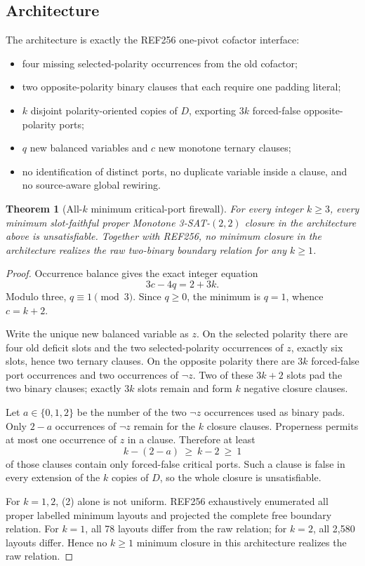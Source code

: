 \documentclass[11pt]{article}
\newtheorem{theorem}{Theorem}
\begin{document}
\subsection{Architecture}
The architecture is exactly the REF256 one-pivot cofactor interface:
\begin{itemize}
\item four missing selected-polarity occurrences from the old cofactor;
\item two opposite-polarity binary clauses that each require one padding literal;
\item $k$ disjoint polarity-oriented copies of $D$, exporting $3k$ forced-false opposite-polarity ports;
\item $q$ new balanced variables and $c$ new monotone ternary clauses;
\item no identification of distinct ports, no duplicate variable inside a clause, and no source-aware global rewiring.
\end{itemize}

\begin{theorem}[All-$k$ minimum critical-port firewall]
For every integer $k\geq3$, every minimum slot-faithful proper Monotone 3-SAT-$(2,2)$ closure in the architecture above is unsatisfiable.  Together with REF256, no minimum closure in the architecture realizes the raw two-binary boundary relation for any $k\geq1$.
\end{theorem}

\begin{proof}
Occurrence balance gives the exact integer equation
\[
        3c-4q=2+3k.                                      \tag{1}
\]
Modulo three, $q\equiv1\pmod3$.  Since $q\geq0$, the minimum is $q=1$, whence $c=k+2$.

Write the unique new balanced variable as $z$.  On the selected polarity there are four old deficit slots and the two selected-polarity occurrences of $z$, exactly six slots, hence two ternary clauses.  On the opposite polarity there are $3k$ forced-false port occurrences and two occurrences of $\neg z$.  Two of these $3k+2$ slots pad the two binary clauses; exactly $3k$ slots remain and form $k$ negative closure clauses.

Let $a\in\{0,1,2\}$ be the number of the two $\neg z$ occurrences used as binary pads.  Only $2-a$ occurrences of $\neg z$ remain for the $k$ closure clauses.  Properness permits at most one occurrence of $z$ in a clause.  Therefore at least
\[
       k-(2-a)\ \geq\ k-2\ \geq\ 1                    \tag{2}
\]
of those clauses contain only forced-false critical ports.  Such a clause is false in every extension of the $k$ copies of $D$, so the whole closure is unsatisfiable.

For $k=1,2$, (2) alone is not uniform.  REF256 exhaustively enumerated all proper labelled minimum layouts and projected the complete free boundary relation.  For $k=1$, all 78 layouts differ from the raw relation; for $k=2$, all 2,580 layouts differ.  Hence no $k\geq1$ minimum closure in this architecture realizes the raw relation.
\end{proof}
\end{document}

